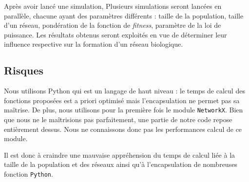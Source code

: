 Après avoir lancé une simulation, Plusieurs simulations seront lancées en parallèle, chacune ayant des paramètres différents : taille de la population, taille d'un réseau, pondération de la fonction de \textit{fitness}, paramètre de la loi de puissance. Les résultats obtenus seront exploités en vue de déterminer leur influence respective sur la formation d'un réseau biologique.

\subsection{Risques}
Nous utilisons Python qui est un langage de haut niveau : le temps de calcul des fonctions proposées est a priori optimisé mais l'encapsulation ne permet pas sa maîtrise. De plus, nous utilisons pour la première fois le module \verb?NetworkX?. Bien que nous ne le ma\^itrisions pas parfaitement, une partie de notre code repose entièrement dessus. Nous ne connaissons donc pas les performances calcul de ce module.

Il est donc à craindre une mauvaise appréhension du temps de calcul liée à la taille de la population et des réseaux ainsi qu'à l'encapsulation de nombreuses fonction \verb?Python?.


